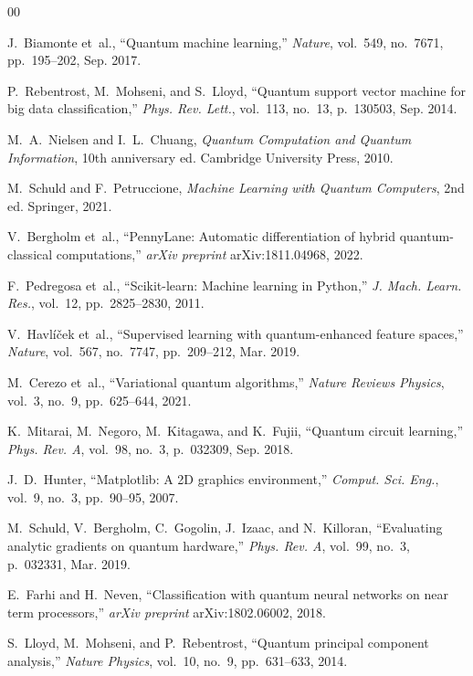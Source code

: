 \documentclass[conference]{IEEEtran}
\begin{document}
\begin{thebibliography}{00}

J.~Biamonte et~al., ``Quantum machine learning,'' \textit{Nature}, vol.~549, no.~7671, pp.~195--202, Sep. 2017.

P.~Rebentrost, M.~Mohseni, and S.~Lloyd, ``Quantum support vector machine for big data classification,'' \textit{Phys. Rev. Lett.}, vol.~113, no.~13, p.~130503, Sep. 2014.

M.~A.~Nielsen and I.~L.~Chuang, \textit{Quantum Computation and Quantum Information}, 10th anniversary ed. Cambridge University Press, 2010.

M.~Schuld and F.~Petruccione, \textit{Machine Learning with Quantum Computers}, 2nd ed. Springer, 2021.

V.~Bergholm et~al., ``PennyLane: Automatic differentiation of hybrid quantum-classical computations,'' \textit{arXiv preprint} arXiv:1811.04968, 2022.

F.~Pedregosa et~al., ``Scikit-learn: Machine learning in Python,'' \textit{J. Mach. Learn. Res.}, vol.~12, pp.~2825--2830, 2011.

V.~Havl{\'{i}}{\v{c}}ek et~al., ``Supervised learning with quantum-enhanced feature spaces,'' \textit{Nature}, vol.~567, no.~7747, pp.~209--212, Mar. 2019.

M.~Cerezo et~al., ``Variational quantum algorithms,'' \textit{Nature Reviews Physics}, vol.~3, no.~9, pp.~625--644, 2021.

K.~Mitarai, M.~Negoro, M.~Kitagawa, and K.~Fujii, ``Quantum circuit learning,'' \textit{Phys. Rev. A}, vol.~98, no.~3, p.~032309, Sep. 2018.

J.~D.~Hunter, ``Matplotlib: A 2D graphics environment,'' \textit{Comput. Sci. Eng.}, vol.~9, no.~3, pp.~90--95, 2007.

M.~Schuld, V.~Bergholm, C.~Gogolin, J.~Izaac, and N.~Killoran, ``Evaluating analytic gradients on quantum hardware,'' \textit{Phys. Rev. A}, vol.~99, no.~3, p.~032331, Mar. 2019.

E.~Farhi and H.~Neven, ``Classification with quantum neural networks on near term processors,'' \textit{arXiv preprint} arXiv:1802.06002, 2018.

S.~Lloyd, M.~Mohseni, and P.~Rebentrost, ``Quantum principal component analysis,'' \textit{Nature Physics}, vol.~10, no.~9, pp.~631--633, 2014.


\end{thebibliography}
\end{document}
